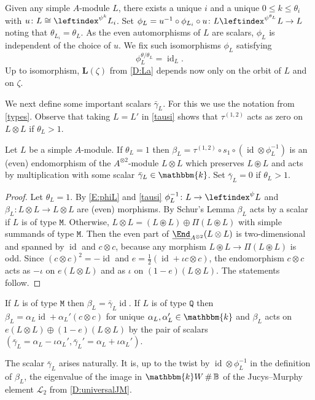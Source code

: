 \documentclass[a4paper,11pt]{amsart}
\newcommand{\uEnd}{\underline{\End}}
\numberwithin{equation}{subsection}
\theoremstyle{definition}
\theoremstyle{theorem}
\theoremstyle{remark}
\newcommand\CL{\mathcal{L}}
\newcommand\Sym{W}
\newcommand\op{\operatorname}
\newcommand\kk{\mathbbm{k}}
\newcommand{\Bo}{\mathbb{B}}
\DeclareMathOperator\Smash{\#}
\begin{document}
Given any simple $A$-module $L$, there exists a unique $i$ and a unique $0\leq k\leq \theta_i$ with  $u\colon L\cong\leftindex^{\psi^k}L_i$.  Set $\phi_L=u^{-1}\circ\phi_{L_i}\circ u\colon L \leftindex^{\psi^{\theta_{L}}}L\to L$ noting that $\theta_{L_i}=\theta_{L}$.  As the even automorphisms of $L$ are
scalars, $\phi_L$ is independent of the choice of $u$. We fix such isomorphisms $\phi_{L}$ satisfying
\begin{equation}\label{E:phinorm}
  \phi_{L}^{\theta/\theta_{L}}=\op{id}_{L} .
\end{equation}
Up to isomorphism,  $\mathbf L(\zeta)$ from  \autoref{D:La} depends now only on the orbit of $L$ and on $\zeta$.


We next define some important scalars $\bar\gamma_L$. For this we
 use the notation from \autoref{types}. Observe that taking $L=L'$ in \autoref{tausi} shows that $\tau^{(1,2)}$ acts as zero on $L\otimes L$ if $\theta_L>1$.
\begin{Lemma}\label{L:tauscalar}
  Let $L$ be a simple $A$-module. If $\theta_L=1$ then
      $\beta_L=\tau^{(1,2)}\circ s_1\circ(\op{id}\otimes\phi_L^{-1})$ is
      an (even) endomorphism of the $A^{\otimes2}$-module $L\otimes L$ which
      preserves $L\circledast L$ and acts by multiplication with some scalar $\bar\gamma_L\in\kk$. Set $\bar\gamma_L=0$ if  $\theta_L>1$.
           \end{Lemma}
           \begin{proof} Let $\theta_L=1$.  By \autoref{E:phiL} and \autoref{tausi} $\phi_L^{-1}\colon L\to\leftindex^{\psi}L$ and $\beta_L\colon L\otimes L\to L\otimes L$  are (even) morphisms. By
  Schur's Lemma $\beta_L$  acts by a scalar if $L$ is of type $\mathtt M$. Otherwise,
  $L\otimes L=(L\circledast L)\oplus\Pi(L\circledast L)$ with
  simple summands of type $\mathtt M$.  Then the even part of $\uEnd_{A^{\otimes2}}(L\otimes L)$
   is  two-dimensional and spanned by $\op{id}$ and $c\otimes c$, because any morphism $L\circledast L\to\Pi(L\circledast L)$ is odd. Since $(c\otimes c)^2=-\op{id}$ and
  $e=\frac12(\op{id}+\iota c\otimes c)$, the endomorphism $c\otimes c$
  acts as $-\iota$ on $e(L\otimes L)$ and as $\iota$ on
  $(1-e)(L\otimes L)$. The statements follow.
\end{proof}

  \begin{Remark}\label{gammaprime}
 If $L$ is of type $\mathtt M$ then $\beta_L=\bar\gamma_L\op{id}$. If $L$ is of type $\mathtt Q$ then $\beta_L=\alpha_L\op{id}+\alpha_L' (c\otimes c)$ for unique $\alpha_L,\alpha_L'\in\kk$ and $\beta_L$ acts on $e(L\otimes L)\oplus(1-e)(L\otimes L)$ by the pair of scalars $(\bar\gamma_L=\alpha_L-\iota\alpha_L',\bar\gamma_L'=\alpha_L+\iota\alpha_L').$
  \end{Remark}
  \begin{Remark}The scalar $\bar\gamma_L$ arises naturally. It is, up to the twist by $\op{id}\otimes\phi_L^{-1}$ in the definition of $\beta_L$, the eigenvalue of the image in $\kk\Sym\Smash\Bo$ of the Jucys--Murphy element $\CL_{2}$ from \autoref{D:universalJM}.
\end{Remark}
\end{document}
